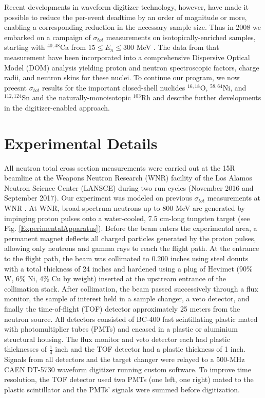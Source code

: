 \documentclass[twocolumn,secnumarabic,amssymb, nobibnotes, aps, prl,
superscriptaddress, nobalancelastpage]{revtex4}
\newcommand{\tots}{\ensuremath{\sigma_{tot}}\,\,}
\begin{document}
Recent developments in waveform digitizer technology, however, have made it
possible to reduce the per-event deadtime by an order of magnitude or more,
enabling a corresponding reduction in the necessary sample size. Thus in 2008 we
embarked on a campaign of \tots measurements on isotopically-enriched samples,
starting with $^{40,48}$Ca from $15 \leq E_{n} \leq 300$ MeV \cite{Shane2010}.
The data from that measurement have been incorporated into a comprehensive
Dispersive Optical Model (DOM) analysis \cite{Mueller2011, Mahzoon2014,
MahzoonPhDThesis} yielding proton and neutron spectroscopic factors, charge
radii, and neutron skins \cite{Mahzoon2017} for these nuclei. To continue our
program, we now preesnt \tots results for the important closed-shell nuclides
$^{16,18}$O, $^{58,64}$Ni, and $^{112,124}$Sn and the naturally-monoisotopic
$^{103}$Rh and describe further developments in the digitizer-enabled
approach.

\section{Experimental Details}
All neutron total cross section measurements were carried out at the 15R
beamline at the Weapons Neutron Research (WNR) facility of the Los Alamos
Neutron Science Center (LANSCE) during two run cycles (November 2016 and
September 2017). Our experiment was modeled on previous
\tots measurements at WNR \cite{Finlay1993,Abfalterer2001,Shane2010}. At WNR,
broad-spectrum neutrons up
to 800 MeV are generated by impinging proton pulses onto a water-cooled, 7.5
cm-long tungsten target (see Fig. \ref{ExperimentalApparatus}). Before the beam
enters the experimental area, a
permanent magnet deflects all charged particles generated by the proton pulses, 
allowing only neutrons and gamma rays to reach the flight path. At the
entrance to the flight path, the beam was collimated to 0.200 inches using steel
donuts with a total thickness of 24 inches and hardened using a plug of Hevimet (90\% W, 6\% 
Ni, 4\% Cu by weight) inserted at the upstream entrance of the
collimation stack. After collimation, the beam passed successively through a flux 
monitor, the sample of interest held in a sample changer, a veto detector, and finally the 
time-of-flight (TOF) detector approximately 25 meters from the neutron source.
All detectors consisted of BC-400 fast scintillating plastic mated with 
photomultiplier tubes (PMTs) and encased in a plastic or
aluminium structural housing. The flux monitor and veto detector each had
plastic thicknesses of $\frac{1}{4}$ inch and the TOF detector had a plastic
thickness of 1 inch. Signals from all detectors and
the target changer were relayed to a 500-MHz CAEN DT-5730 waveform digitizer
running custom software. To improve time resolution, the TOF detector used two
PMTs (one left, one right) mated to the plastic scintillator and the PMTs' signals were 
summed before digitization.
\end{document}

